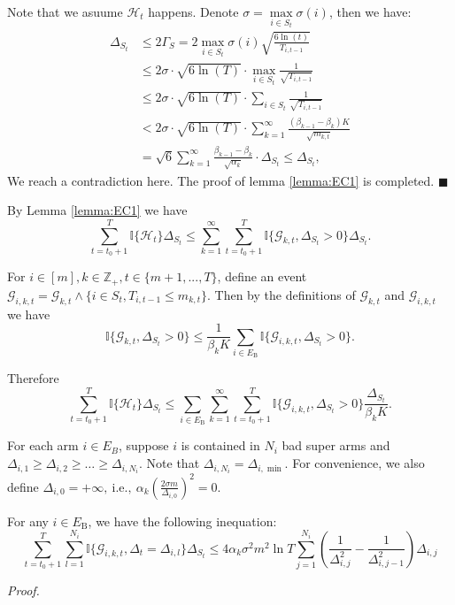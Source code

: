 \documentclass[opre,sglanonrev]{informs4}
\begin{document}
Note that we asuume $\mathcal{H}_t$ happens. Denote $\sigma = \mathop{\max}\limits_{i\in S_t}\sigma(i)$, then we have: 
$$\begin{aligned}
\Delta_{S_t} & \leq 2\Gamma_S=2\mathop{\max}\limits_{i\in S_t}\sigma(i)\sqrt{\frac{6\ln(t)}{T_{i,t-1}}}\\
&\leq 2\sigma \cdot \sqrt{6\ln(T)}\cdot \mathop{\max}\limits_{i\in S_t}\frac{1}{\sqrt{T_{i,t-1}}}\\
&\leq 2\sigma \cdot \sqrt{6\ln(T)}\cdot \sum_{i\in S_t}\frac{1}{\sqrt{T_{i,t-1}}}\\
&<2\sigma \cdot \sqrt{6\ln(T)}\cdot \sum_{k=1}^\infty\frac{(\beta_{k-1}-\beta_k)K}{\sqrt{m_{k,t}}}\\
&=\sqrt{6}\sum_{k=1}^\infty\frac{\beta_{k-1}-\beta_k}{\sqrt{\alpha_k}}\cdot \Delta_{S_t}\leq\Delta_{S_t},
\end{aligned}$$
We reach a contradiction here. The proof of lemma \ref{lemma:EC1} is completed.
\hfill $\blacksquare$

By Lemma \ref{lemma:EC1} we have
$$\sum_{t=t_0+1}^T\mathbb{I} \{\mathcal{H}_t\}\Delta_{S_t}\leq\sum_{k=1}^\infty\sum_{t=t_0+1}^T\mathbb{I}\{\mathcal{G}_{k,t},\Delta_{S_t}>0\}\Delta_{S_t}.$$

For $i\in [m], k\in \mathbb{Z}_+, t\in \{m+1,...,T\}$, define an event $\mathcal{G}_{i,k,t}=\mathcal{G}_{k,t}\wedge\{i\in S_t,T_{i,t-1}\leq m_{k,t}\}.$
Then by the definitions of $\mathcal{G}_{k,t}$ and $\mathcal{G}_{i,k,t}$ we have
$$\mathbb{I}\{\mathcal{G}_{k,t},\Delta_{S_t}>0\}\leq\frac{1}{\beta_kK}\sum_{i\in E_\mathrm{B}}\mathbb{I}\{\mathcal{G}_{i,k,t},\Delta_{S_t}>0\}.$$

Therefore
$$\sum_{t=t_0+1}^T\mathbb{I}\{\mathcal{H}_t\}\Delta_{S_t}\leq\sum_{i\in E_\mathrm{B}}\sum_{k=1}^\infty\sum_{t=t_0+1}^T\mathbb{I}\{\mathcal{G}_{i,k,t},\Delta_{S_t}>0\}\frac{\Delta_{S_t}}{\beta_kK}.$$

For each arm $i\in E_B$, suppose $i$ is contained in $N_i$ bad super arms and $\Delta_{i,1}\geq\Delta_{i,2}\geq\ldots\geq\Delta_{i,N_i}$. Note that $\Delta_{i,N_i}=\Delta_{i,\min}$. For convenience, we also define $\Delta_{i,0}=+\infty,\mathrm{~i.e.,~}\alpha_k\left(\frac{2\sigma m}{\Delta_{i,0}}\right)^2=0$. 

\begin{lemma}
    \label{lemma:EC2}
For any $i\in E_\mathrm{B}$, we have the following inequation:
$$\sum_{t=t_0+1}^T\sum_{l=1}^{N_i}\mathbb{I}\{\mathcal{G}_{i,k,t},\Delta_t=\Delta_{i,l}\}\Delta_{S_t}\leq 4\alpha_k \sigma^2 m^2\ln T\sum_{j=1}^{N_i}\left(\frac{1}{\Delta_{i,j}^2}-\frac{1}{\Delta_{i,j-1}^2}\right)\Delta_{i,j}$$
\end{lemma}
\textit{Proof.} 
\end{document}
